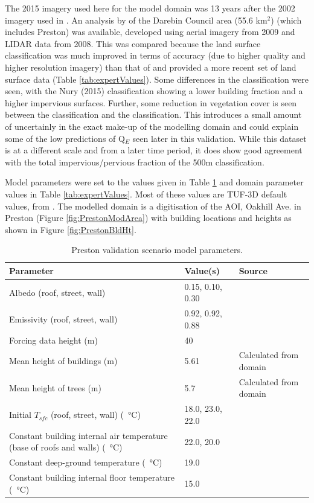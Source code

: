 \documentclass[final,3p,times,authoryear]{elsarticle}
\begin{document}
The 2015 imagery used here for the model domain was 13 years after the 2002 imagery used in \cite{Coutts2007}. An analysis by \cite{Nury2015} of the Darebin Council area (55.6 km$^{2}$) (which includes Preston) was available, developed using aerial imagery from 2009 and LIDAR data from 2008. This was compared because the land surface classification was much improved in terms of accuracy (due to higher quality and higher resolution imagery) than that of \cite{Coutts2007} and provided a more recent set of land surface data (Table \ref{tab:expertValues}). Some differences in the classification were seen, with the Nury (2015) classification showing a lower building fraction and a higher impervious surfaces. Further, some reduction in vegetation cover is seen between the \cite{Coutts2007} classification and the \cite{Nury2015} classification. This introduces a small amount of uncertainly in the exact make-up of the modelling domain and could explain some of the low predictions of Q$_{E}$ seen later in this validation. While this dataset is at a different scale and from a later time period, it does show good agreement with the total impervious/pervious fraction of the 500m classification.


Model parameters were set to the values given in Table \ref{tab:modprvalpara} and domain parameter values in Table \ref{tab:expertValues}. Most of these values are TUF-3D default values, from \cite{Krayenhoff2007}. The modelled domain is a digitisation of the AOI, Oakhill Ave. in Preston (Figure \ref{fig:PrestonModArea}) with building locations and heights as shown in Figure \ref{fig:PrestonBldHt}.


\begin{table}[!htbp]
\caption{Preston validation scenario model parameters. \label{tab:modprvalpara}}     
\begin{tabular}{| p{8.0cm} | l | l|}
\hline
\textbf{Parameter} & \textbf{Value(s)} & \textbf{Source}\\ \hline
Albedo (roof, street, wall)   & 0.15, 0.10, 0.30   & \cite{Krayenhoff2007}\\ \hline
Emissivity (roof, street, wall)   & 0.92, 0.92, 0.88   & \cite{Krayenhoff2007}\\ \hline
Forcing data height (m)  & 40   & \cite{Coutts2007} \\ \hline
Mean height of buildings (m)  & 5.61   & Calculated from domain \\ \hline
Mean height of trees (m)  & 5.7   & Calculated from domain \\ \hline
Initial $T_{sfc}$ (roof, street, wall) (\SI{}{\degreeCelsius})  & 18.0, 23.0, 22.0  & \cite{Krayenhoff2007}  \\ \hline
Constant building internal air temperature (base of roofs and walls) (\SI{}{\degreeCelsius})  & 22.0, 20.0 & \cite{Krayenhoff2007}   \\ \hline
Constant deep-ground temperature (\SI{}{\degreeCelsius})  & 19.0  & \cite{Krayenhoff2007} \\ \hline
Constant building internal floor temperature (\SI{}{\degreeCelsius})  & 15.0  & \cite{Krayenhoff2007} \\ \hline
\end{tabular}
\end{table}
\end{document}
